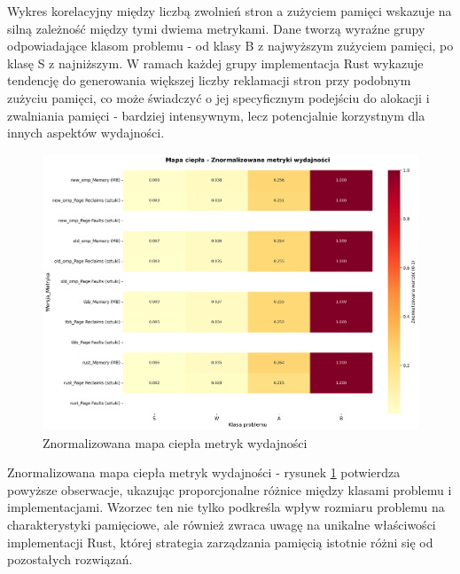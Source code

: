 Wykres korelacyjny między liczbą zwolnień stron a zużyciem pamięci wskazuje na silną zależność między tymi dwiema metrykami. Dane tworzą wyraźne grupy odpowiadające klasom problemu - od klasy B z najwyższym zużyciem pamięci, po klasę S z najniższym. W ramach każdej grupy implementacja Rust wykazuje tendencję do generowania większej liczby reklamacji stron przy podobnym zużyciu pamięci, co może świadczyć o jej specyficznym podejściu do alokacji i zwalniania pamięci - bardziej intensywnym, lecz potencjalnie korzystnym dla innych aspektów wydajności.
\begin{figure}[H]
    \centering
    \includegraphics[width=\textwidth]{analiza/images/parallel/is/x86/chart_03_heatmap.png}
    \caption{Znormalizowana mapa ciepła metryk wydajności}
    \label{is_heatmap_wydajnosci_x86}
\end{figure}
Znormalizowana mapa ciepła metryk wydajności - rysunek \ref{is_heatmap_wydajnosci_x86} potwierdza powyższe obserwacje, ukazując proporcjonalne różnice między klasami problemu i implementacjami. Wzorzec ten nie tylko podkreśla wpływ rozmiaru problemu na charakterystyki pamięciowe, ale również zwraca uwagę na unikalne właściwości implementacji Rust, której strategia zarządzania pamięcią istotnie różni się od pozostałych rozwiązań.

